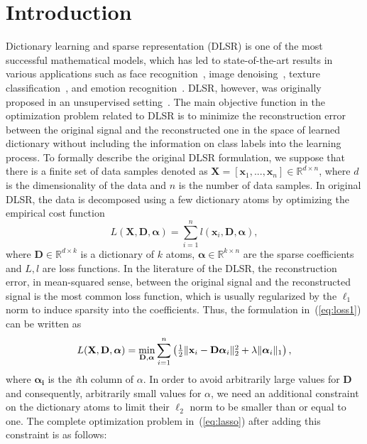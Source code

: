 \documentclass{llncs}
\begin{document}
\section{Introduction}
\label{sec:intro}
%

Dictionary learning and sparse representation (DLSR) is one of the most successful mathematical models, which has led to state-of-the-art results in various applications such as face recognition~\cite{DL:Zhong07,DL:Wright09,DL:MengYang11}, image denoising~\cite{DL:Mairal08}, texture classification~\cite{Gangeh:ICIAR11}, and emotion recognition~\cite{Gangeh:TASLP14}. DLSR, however, was originally proposed in an unsupervised setting~\cite{book:Elad}. The main objective function in the optimization problem related to DLSR is to minimize the reconstruction error between the original signal and the reconstructed one in the space of learned dictionary without including the information on class labels into the learning process. To formally describe the original DLSR formulation, we suppose that there is a finite set of data samples denoted as $\mathbf{X}=[\mathbf{x}_1,...,\mathbf{x}_n]\in\mathbb{R}^{d\times n}$, where $d$ is the dimensionality of the data and $n$ is the number of data samples. In original DLSR, the data is decomposed using a few dictionary atoms by optimizing the empirical cost function
\begin{equation}\label{eq:loss1}
L(\mathbf{X},\mathbf{D},\bm{\alpha})=\sum_{i=1}^{n}l(\mathbf{x}_i,\mathbf{D},\bm{\alpha}),
\end{equation}
where $\mathbf{D}\in\mathbb{R}^{d\times k}$ is a dictionary of $k$ atoms, $\bm{\alpha}\in\mathbb{R}^{k\times n}$ are the sparse coefficients and $L, l$ are loss functions. In the literature of the DLSR, the reconstruction error, in mean-squared sense, between the original signal and the reconstructed signal is the most common loss function, which is usually regularized by the $\ell_1$ norm to induce sparsity into the coefficients. Thus, the formulation in~(\ref{eq:loss1}) can be written as
\begin{equation}\label{eq:lasso}
L(\mathbf{X},\mathbf{D},\bm{\alpha})=\min_{\mathbf{D},\bm{\alpha}}\sum_{i=1}^{n}\begin{pmatrix}\frac{1}{2}\|\mathbf{x}_i-\mathbf{D}\bm{\alpha}_i\|_{\textup{2}}^{2}+\lambda\|\bm{\alpha}_i\|_{1}\end{pmatrix},
\end{equation}
where $\bm{\alpha_i}$ is the \emph{i}th column of $\alpha$. In order to avoid arbitrarily large values for $\mathbf{D}$ and consequently, arbitrarily small values for $\alpha$, we need an additional constraint on the dictionary atoms to limit their $\ell_2$ norm to be smaller than or equal to one. The complete optimization problem in~(\ref{eq:lasso}) after adding this constraint is as follows:
\end{document}
